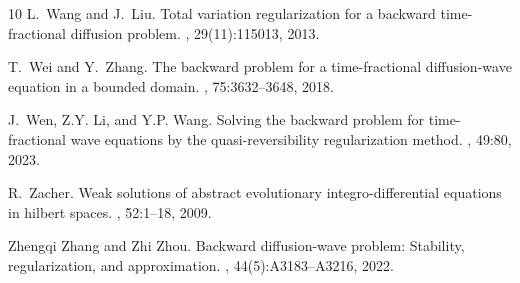 \documentclass[11pt]{article}
\numberwithin{equation}{section}
\begin{document}
\begin{thebibliography}{10}
L.~Wang and J.~Liu.
\newblock Total variation regularization for a backward time-fractional
  diffusion problem.
, 29(11):115013, 2013.

T.~Wei and Y.~Zhang.
\newblock The backward problem for a time-fractional diffusion-wave equation in
  a bounded domain.
, 75:3632--3648,
  2018.

J.~Wen, Z.Y. Li, and Y.P. Wang.
\newblock Solving the backward problem for time-fractional wave equations by
  the quasi-reversibility regularization method.
, 49:80, 2023.

R.~Zacher.
\newblock Weak solutions of abstract evolutionary integro-differential
  equations in hilbert spaces.
, 52:1--18, 2009.

Zhengqi Zhang and Zhi Zhou.
\newblock Backward diffusion-wave problem: Stability, regularization, and
  approximation.
, 44(5):A3183--A3216, 2022.

\end{thebibliography}
\end{document}
